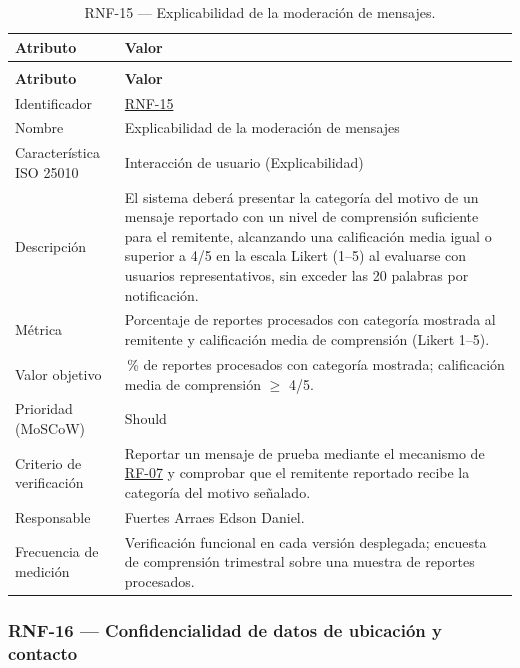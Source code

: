 \documentclass[journal,onecolumn]{IEEEtran}
\makeatletter
\newenvironment{atributos}[2]{%
	\small
	\begin{longtable}{@{}>{\raggedright\arraybackslash}p{4.2cm} >{\raggedright\arraybackslash}p{11.2cm}@{}}
		\caption{#2}\label{tab:#1}\\
		\toprule
		\textbf{Atributo} & \textbf{Valor} \\
		\midrule
		\endfirsthead
		\multicolumn{2}{@{}l}{\small\itshape (continuación)}\\
		\toprule
		\textbf{Atributo} & \textbf{Valor} \\
		\midrule
		\endhead
		\bottomrule
		\endlastfoot
	}{%
	\end{longtable}
	\normalsize
}
\makeatother
\begin{document}
	\begin{atributos}{RNF-15}{RNF-15 --- Explicabilidad de la moderación de mensajes.}
		Identificador & \hyperref[tab:RNF-15]{RNF-15} \\
		Nombre & Explicabilidad de la moderación de mensajes \\
		Característica ISO 25010 & Interacción de usuario (Explicabilidad) \\
		Descripción & El sistema deberá presentar la categoría del motivo de un mensaje reportado con un nivel de comprensión suficiente para el remitente, alcanzando una calificación media igual o superior a 4/5 en la escala Likert (1–5) al evaluarse con usuarios representativos, sin exceder las 20 palabras por notificación. \\
		Métrica & Porcentaje de reportes procesados con categoría mostrada al remitente y calificación media de comprensión (Likert 1--5). \\
		Valor objetivo & 100\,\% de reportes procesados con categoría mostrada; calificación media de comprensión $\geq$ 4/5. \\
		Prioridad (MoSCoW) & Should \\
		Criterio de verificación & Reportar un mensaje de prueba mediante el mecanismo de \hyperref[tab:RF-07]{RF-07} y comprobar que el remitente reportado recibe la categoría del motivo señalado. \\
		Responsable & Fuertes Arraes Edson Daniel. \\
		Frecuencia de medición & Verificación funcional en cada versión desplegada; encuesta de comprensión trimestral sobre una muestra de reportes procesados. \\
	\end{atributos}
	
	
	\subsubsection{RNF-16 --- Confidencialidad de datos de ubicación y contacto}
	
\end{document}
